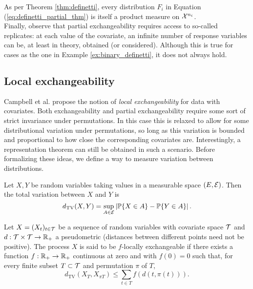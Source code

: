 As per Theorem \ref{thm:definetti}, every distribution $F_i$ in Equation (\ref{eq:definetti_partial_thm}) is itself a product measure on $\mathcal{X}^{n_i}$. \\


Finally, observe that partial exchangeability requires access to so-called replicates: at each value of the covariate, an infinite number of response variables can be, at least in theory, obtained (or considered). Although this is true for cases as the one in Example \ref{ex:binary_definetti}, it does not always hold.



\subsection{Local exchangeability}


Campbell et al. \cite{CampbellEtAl:2019:LocalExch} propose the notion of \textit{local exchangeability} for data with covariates. Both exchangeability and partial exchangeability require some sort of strict invariance under permutations. In this case this is relaxed to allow for some distributional variation under permutations, so long as this variation is bounded and proportional to how close the corresponding covariates are. Interestingly, a representation theorem can still be obtained in such a scenario. Before formalizing these ideas, we define a way to measure variation between distributions.


\begin{definition}
	Let $X, Y$ be random variables taking values in a measurable space $(E, \mathcal{E})$. Then the total variation between $X$ and $Y$ is
	\begin{equation*}
		d_{\mathrm{TV}} (X, Y) = \sup_{A \in \mathcal{E}} \left| \mathbb{P} \{ X \in A \} - \mathbb{P} \{Y \in A \} \right|.
	\end{equation*}
\end{definition}


\begin{definition}
	Let $X = (X_t)_{t \in \mathcal{T}}$ be a sequence of random variables with covariate space $\mathcal{T}$ and $d: \mathcal{T} \times \mathcal{T} \to \mathbb{R}_{+}$ a pseudometric (distances between different points need not be positive). The process $X$ is said to be $f$-locally exchangeable if there exists a function $f: \mathbb{R}_{+} \to \mathbb{R}_{+}$ continuous at zero and with $f(0) = 0$ such that, for every finite subset $T \subset \mathcal{T}$ and permutation $\pi$ of $T$,
	\begin{equation} \label{eq:local_exch}
		d_{\mathrm{TV}} (X_T, X_{\pi T}) \leq \sum_{t \in T} f(d(t, \pi(t))).
	\end{equation}
\end{definition}


